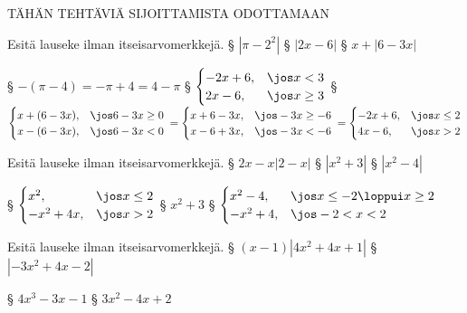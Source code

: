 \begin{tehtavasivu}

\sarjaA
\sarjaB
\sarjaC
\sarjaD

TÄHÄN TEHTÄVIÄ SIJOITTAMISTA ODOTTAMAAN

\begin{tehtava}
	Esitä lauseke ilman itseisarvomerkkejä.
	\alakohdat
		§ $|\pi-2^2|$
		§ $|2x-6|$
		§ $x+|6-3x|$
	\loppu
	\begin{vastaus}
		\alakohdat
			§ $-(\pi-4)=-\pi+4=4-\pi$
			§ $\begin{cases}
					-2x+6, & \jos x<3 \\
					2x-6, & \jos x \geq 3
				\end{cases}$
			§ $\begin{cases}
					x+(6-3x), & \jos 6-3x \geq0 \\
					x-(6-3x), & \jos 6-3x <0 
				\end{cases}\\
				=\begin{cases}
					x+6-3x, & \jos -3x \geq-6 \\
					x-6+3x, & \jos -3x <-6 
				\end{cases}\\
				=\begin{cases}
					-2x+6, & \jos x \leq2 \\
					4x-6, & \jos x >2 
				\end{cases}$
		\loppu
	\end{vastaus}
\end{tehtava}

\begin{tehtava}
	Esitä lauseke ilman itseisarvomerkkejä.
	\alakohdat
		§ $2x-x|2-x|$
		§ $|x^2+3|$
		§ $|x^2-4|$
	\loppu
	\begin{vastaus}
		\alakohdat
			§ $\begin{cases}
					x^2, & \jos x \leq2 \\
					-x^2+4x, & \jos x>2 
				\end{cases}$
			§ $x^2+3$
			§ $\begin{cases}
					x^2-4, & \jos x \leq -2 \loppui x \geq 2 \\
					-x^2+4, & \jos -2<x<2 
				\end{cases}$
		\loppu
	\end{vastaus}
\end{tehtava}

\begin{tehtava}
	Esitä lauseke ilman itseisarvomerkkejä.
	\alakohdat
		§ $(x-1)|4x^2+4x+1|$
		§ $|-3x^2+4x-2|$
	\loppu
	\begin{vastaus}
		\alakohdat
			§ $4x^3-3x-1$
			§ $3x^2-4x+2$
		\loppu
	\end{vastaus}
\end{tehtava}


\end{tehtavasivu}
